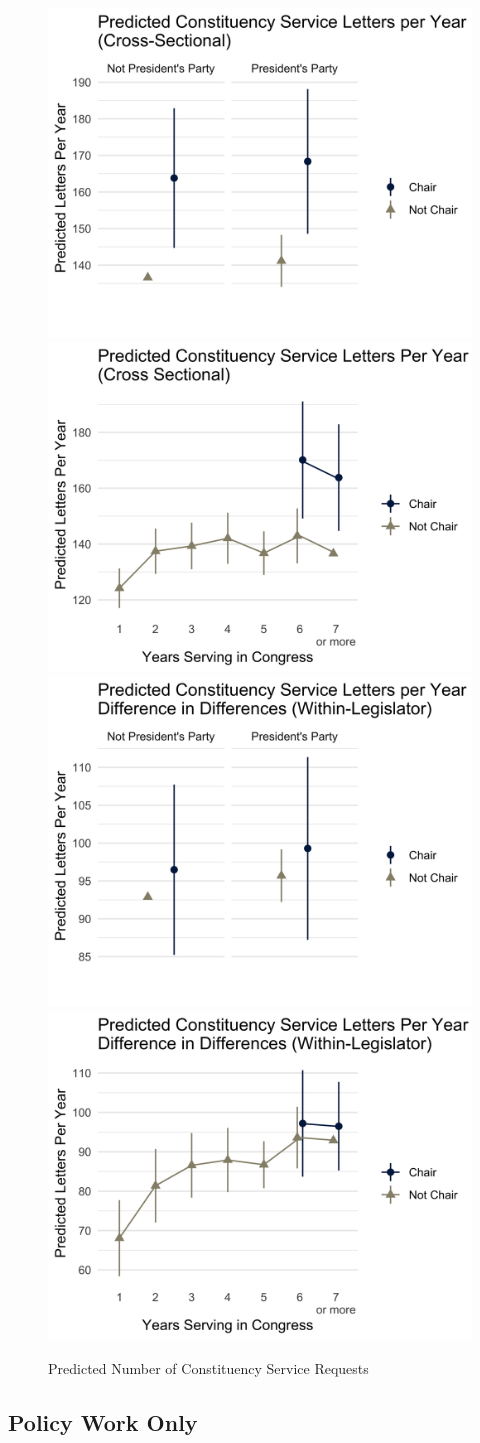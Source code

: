 \documentclass[12pt]{article}
\begin{document}
{\begin{figure}[hbt!]
\centering
\caption{Predicted Number of Constituency Service Requests} \label{f:m-con-predicted}
\includegraphics[width = .49\textwidth]{figs/m-con-predicted-1}
\includegraphics[width = .49\textwidth]{figs/m-con-predicted-2}
\includegraphics[width = .49\textwidth]{figs/m-con-predicted-3}
\includegraphics[width = .49\textwidth]{figs/m-con-predicted-4}

\end{figure}

\subsection{Policy Work Only}

}
\end{document}
